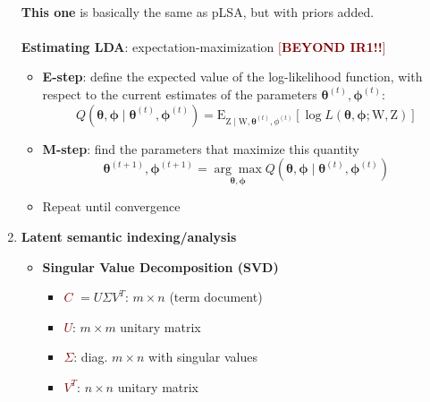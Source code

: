 \begin{enumerate}
    \\
    \textbf{This one} is basically the same as pLSA, but with priors added. 
    \\
    \\
    \textbf{Estimating LDA}: expectation-maximization \textbf{\textcolor{Maroon}{$[$BEYOND IR1!!$]$}} \\
    \begin{itemize}
        \item \textbf{E-step}: define the expected value of the log-likelihood function, with respect to the current estimates of the parameters $\boldsymbol{\theta}^{(t)}, \boldsymbol{\phi}^{(t)}:$
        $$ Q\left(\boldsymbol{\theta}, \boldsymbol{\phi} \mid \boldsymbol{\theta}^{(t)}, \boldsymbol{\phi}^{(t)}\right)=\mathrm{E}_{\mathrm{Z} \mid \mathrm{W}, \boldsymbol{\theta}^{(t)}, \phi^{(t)}}[\log L(\boldsymbol{\theta}, \boldsymbol{\phi} ; \mathrm{W}, \mathrm{Z})] $$
        \item \textbf{M-step}: find the parameters that maximize this quantity
        $$ 
        \boldsymbol{\theta}^{(t+1)}, \boldsymbol{\phi}^{(t+1)}=\underset{\boldsymbol{\theta}, \boldsymbol{\phi}}{\arg \max } Q\left(\boldsymbol{\theta}, \boldsymbol{\phi} \mid \boldsymbol{\theta}^{(t)}, \boldsymbol{\phi}^{(t)}\right)
        $$
        \item Repeat until convergence
    \end{itemize}
    \item \textbf{Latent semantic indexing/analysis}
    \begin{itemize}
        \item \textbf{Singular Value Decomposition (SVD)} \\
        \begin{minipage}{0.5\textwidth}
            \begin{itemize}
                \setlength\itemsep{0em}
                \item \textcolor{Maroon}{$C$} $=U\Sigma V^T$: $m \times n$ (term document) 
                \item \textcolor{Maroon}{$U$}: $m \times m$ unitary matrix 
            \end{itemize}
        \end{minipage}
        \begin{minipage}{0.5\textwidth}
            \begin{itemize}
                \setlength\itemsep{0em}
                \item \textcolor{Maroon}{$\Sigma$}: diag. $m \times n$ with singular values 
                \item \textcolor{Maroon}{$V^T$}: $n \times n$ unitary matrix
            \end{itemize}
        \end{minipage}
        

\end{itemize}
\end{enumerate}
